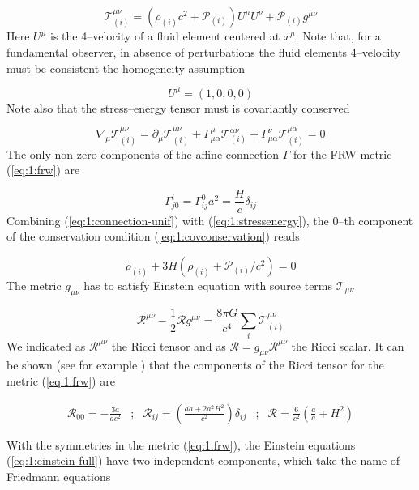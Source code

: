 \begin{equation}
\label{eq:1:stressenergy}
\mathcal{T}_{(i)}^{\mu\nu} = \left(\rho_{(i)}c^2+\mathcal{P}_{(i)}\right)U^\mu U^\nu + \mathcal{P}_{(i)}g^{\mu\nu}
\end{equation} 
%
Here $U^\mu$ is the 4--velocity of a fluid element centered at $x^\mu$. Note that, for a fundamental observer, in absence of perturbations the fluid elements 4--velocity must be consistent the homogeneity assumption 

\begin{equation}
\label{eq:1:4-momentum-unif}
U^\mu = (1,0,0,0)
\end{equation}
%
Note also that the stress--energy tensor must is covariantly conserved

\begin{equation}
\label{eq:1:covconservation}
\nabla_\mu \mathcal{T}^{\mu\nu}_{(i)} = \partial_\mu \mathcal{T}^{\mu\nu}_{(i)} + \Gamma_{\mu\alpha}^\mu \mathcal{T}^{\alpha\nu}_{(i)} + \Gamma^\nu_{\mu\alpha}\mathcal{T}^{\mu\alpha}_{(i)} = 0 
\end{equation} 
%
The only non zero components of the affine connection $\Gamma$ for the FRW metric (\ref{eq:1:frw}) are

\begin{equation}
\label{eq:1:connection-unif}
\Gamma^i_{j0} = {\Gamma^0_{ij}}{a^2} = \frac{H}{c}\delta_{ij}
\end{equation}
%
Combining (\ref{eq:1:connection-unif}) with (\ref{eq:1:stressenergy}), the 0--th component of the conservation condition (\ref{eq:1:covconservation}) reads

\begin{equation}
\label{eq:1:rho-conservation}
\dot{\rho}_{(i)} + 3H\left(\rho_{(i)} + \mathcal{P}_{(i)}/c^2\right) = 0
\end{equation}
%
The metric $g_{\mu\nu}$ has to satisfy Einstein equation with source terms $\mathcal{T}_{\mu\nu}$

\begin{equation}
\label{eq:1:einstein-full}
\mathcal{R}^{\mu\nu}-\frac{1}{2}\mathcal{R}g^{\mu\nu} = \frac{8\pi G}{c^4}\sum_i \mathcal{T}^{\mu\nu}_{(i)}
\end{equation}
%
We indicated as $\mathcal{R}^{\mu\nu}$ the Ricci tensor and as $\mathcal{R}=g_{\mu\nu}\mathcal{R}^{\mu\nu}$ the Ricci scalar. It can be shown (see for example \citep{Dodelson-C1}) that the components of the Ricci tensor for the metric (\ref{eq:1:frw}) are 

\begin{equation}
\label{eq:1:ricci}
\begin{matrix}
\displaystyle \mathcal{R}_{00} = -\frac{3\ddot{a}}{ac^2} & ; & \displaystyle \mathcal{R}_{ij} = \left(\frac{a\ddot{a}+2a^2H^2}{c^2}\right)\delta_{ij} & ; & \displaystyle \mathcal{R} = \frac{6}{c^2}\left(\frac{\ddot{a}}{a}+H^2\right) \\ \\ 
\end{matrix}
\end{equation}
%
With the symmetries in the metric (\ref{eq:1:frw}), the Einstein equations (\ref{eq:1:einstein-full}) have two independent components, which take the name of Friedmann equations 

